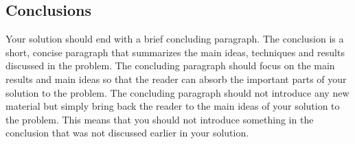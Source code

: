 











\secondpage
\subsection*{Conclusions}

Your solution should end with a brief concluding paragraph. The
conclusion is a short, concise paragraph that summarizes the main
ideas, techniques and results discussed in the problem.  The
concluding paragraph should focus on the main results and main ideas
so that the reader can absorb the important parts of your solution to
the problem. The concluding paragraph should not
introduce any new material but simply bring back the reader to the main ideas
of your solution to the problem. This means that you should not
introduce something in the conclusion that was not discussed earlier in
your solution.

